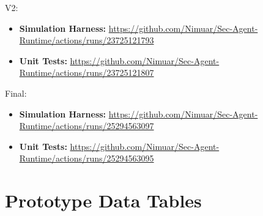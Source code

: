 \documentclass[conference]{IEEEtran}
\begin{document}
V2: 
\begin{itemize}
    \item \textbf{Simulation Harness:} \hyperlink{https://github.com/Nimuar/Sec-Agent-Runtime/actions/runs/23725121793}{https://github.com/Nimuar/Sec-Agent-Runtime/actions/runs/23725121793}
    \item \textbf{Unit Tests:} \hyperlink{https://github.com/Nimuar/Sec-Agent-Runtime/actions/runs/23725121807}{https://github.com/Nimuar/Sec-Agent-Runtime/actions/runs/23725121807}
\end{itemize}

Final:
\begin{itemize}
    \item \textbf{Simulation Harness:} \hyperlink{https://github.com/Nimuar/Sec-Agent-Runtime/actions/runs/25294563097}{https://github.com/Nimuar/Sec-Agent-Runtime/actions/runs/25294563097}
    \item \textbf{Unit Tests:} \hyperlink{https://github.com/Nimuar/Sec-Agent-Runtime/actions/runs/25294563095}{https://github.com/Nimuar/Sec-Agent-Runtime/actions/runs/25294563095}
\end{itemize}

\section{Prototype Data Tables}

\begin{table}[htbp]
\centering
\caption{Quantitative Results of V2 Pipeline Evaluation}
\label{tab:results_v2}

\end{table}
\end{document}
